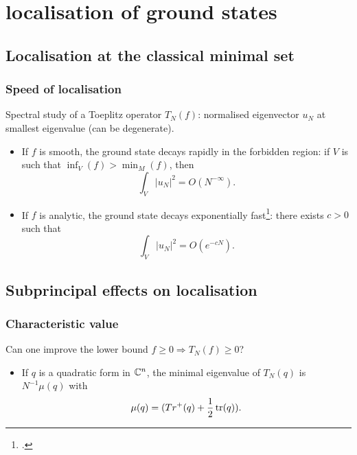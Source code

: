 \documentclass[mathserif]{beamer}
\begin{document}
\section{localisation of ground states}
\subsection{Localisation at the classical minimal set}
\begin{frame}
  \frametitle{Speed of localisation}
  Spectral study of a Toeplitz operator $T_N(f)$: normalised
  eigenvector $u_N$ at smallest eigenvalue (can be degenerate).
  \begin{itemize}
    \item<2->  If $f$ is smooth, the ground state decays
      rapidly in the forbidden region: if $V$ is such that
      $\inf_V(f)>\min_M(f)$, then \[\int_{V}|u_N|^2=O(N^{-\infty}).\]
    \item<3> If $f$ is analytic, the ground state decays exponentially
      fast\footcite{deleporte_toeplitz_2018}: there exists $c>0$ such that
      \[
        \int_{V}|u_N|^2=O(e^{-cN}).
      \]\vspace{-1em}
    \end{itemize}
  \end{frame}

\subsection{Subprincipal effects on localisation}
\begin{frame}
  \frametitle{Characteristic value}
  Can one improve the lower bound $f\geq 0\Rightarrow T_N(f)\geq 0$?
  \begin{itemize}
  \item If $q$ is a quadratic form in $\mathbb{C}^n$, the minimal eigenvalue
    of $T_N(q)$ is $N^{-1}\mu(q)$ with $$\mu(q)=(Tr^+(q)+\frac
    12 \operatorname{tr}(q)).$$

\end{itemize}
\end{frame}
\end{document}
